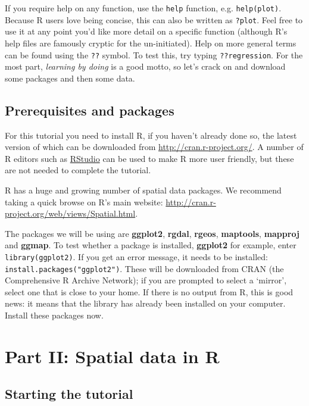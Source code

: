\documentclass[]{article}
\begin{document}
If you require help on any function, use the \texttt{help} function,
e.g. \texttt{help(plot)}. Because R users love being concise, this can
also be written as \texttt{?plot}. Feel free to use it at any point
you'd like more detail on a specific function (although R's help files
are famously cryptic for the un-initiated). Help on more general terms
can be found using the \texttt{??} symbol. To test this, try typing
\texttt{??regression}. For the most part, \emph{learning by doing} is a
good motto, so let's crack on and download some packages and then some
data.

\subsection{Prerequisites and
packages}\label{prerequisites-and-packages}

For this tutorial you need to install R, if you haven't already done so,
the latest version of which can be downloaded from
\href{http://cran.r-project.org/}{\url{http://cran.r-project.org/}}. A
number of R editors such as \href{http://www.rstudio.com/}{RStudio} can
be used to make R more user friendly, but these are not needed to
complete the tutorial.

R has a huge and growing number of spatial data packages. We recommend
taking a quick browse on R's main website:
\href{http://cran.r-project.org/web/views/Spatial.html}{\url{http://cran.r-project.org/web/views/Spatial.html}}.

The packages we will be using are \textbf{ggplot2}, \textbf{rgdal},
\textbf{rgeos}, \textbf{maptools}, \textbf{mapproj} and \textbf{ggmap}.
To test whether a package is installed, \textbf{ggplot2} for example,
enter \texttt{library(ggplot2)}. If you get an error message, it needs
to be installed: \texttt{install.packages("ggplot2")}. These will be
downloaded from CRAN (the Comprehensive R Archive Network); if you are
prompted to select a `mirror', select one that is close to your home. If
there is no output from R, this is good news: it means that the library
has already been installed on your computer. Install these packages now.

\section{Part II: Spatial data in R}\label{part-ii-spatial-data-in-r}

\subsection{Starting the tutorial}\label{starting-the-tutorial}
\end{document}

